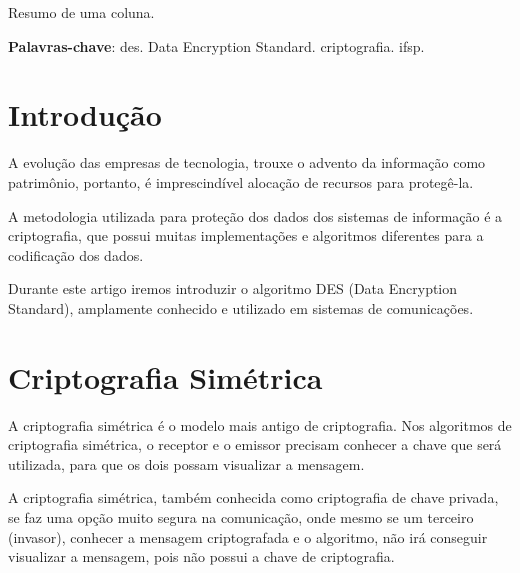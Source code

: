 \documentclass[
	article,			%
	11pt,				%
	oneside,			%
	a4paper,			%
	english,			%
	brazil,				%
	sumario=tradicional
	]{abntex2}
\begin{document}

\frenchspacing

\maketitle

\begin{resumoumacoluna}
 Resumo de uma coluna.
 
 \vspace{\onelineskip}
 
 \noindent
 \textbf{Palavras-chave}: des. Data Encryption Standard. criptografia. ifsp.
\end{resumoumacoluna}

\textual

\section*{Introdução}
\nocite{sistema-des}
\nocite{criptografia-simetrica-assimetrica-cifragem}
\nocite{estudo-descritivo-criptografia}

A evolução das empresas de tecnologia, trouxe o advento da informação como patrimônio, portanto, é imprescindível alocação de recursos para protegê-la.

A metodologia utilizada para proteção dos dados dos sistemas de informação é a criptografia, que possui muitas implementações e algoritmos diferentes para a codificação dos dados.

Durante este artigo iremos introduzir o algoritmo DES (Data Encryption Standard), amplamente conhecido e utilizado em sistemas de comunicações.

\section{Criptografia Simétrica}

A criptografia simétrica é o modelo mais antigo de criptografia. Nos algoritmos de criptografia simétrica, o receptor e o emissor precisam conhecer a chave que será utilizada, para que os dois possam visualizar a mensagem.

A criptografia simétrica, também conhecida como criptografia de chave privada, se faz uma opção muito segura na comunicação, onde mesmo se um terceiro (invasor), conhecer a mensagem criptografada e o algoritmo, não irá conseguir visualizar a mensagem, pois não possui a chave de criptografia.
\end{document}
